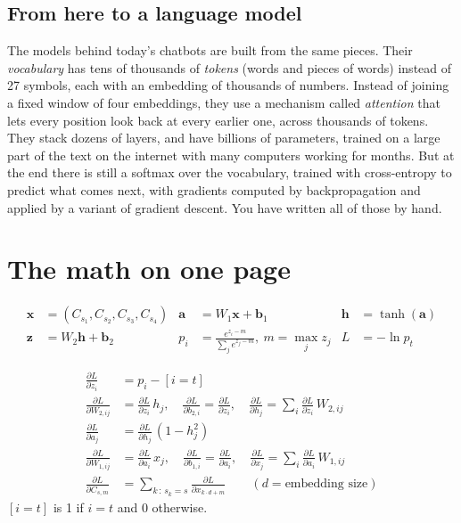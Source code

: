 \documentclass[11pt,a4paper,oneside,openany]{book}
\newcommand{\vect}[1]{\mathbf{#1}}
\newcommand{\pd}[2]{\frac{\partial #1}{\partial #2}}
\begin{document}
\section{From here to a language model}

The models behind today's chatbots are built from the same pieces. Their
\emph{vocabulary} has tens of thousands of \emph{tokens} (words and pieces
of words) instead of 27 symbols, each with an embedding of thousands of
numbers. Instead of joining a fixed window of four embeddings, they use a
mechanism called \emph{attention} that lets every position look back at
every earlier one, across thousands of tokens. They stack dozens of
layers, and have billions of parameters, trained on a large part of the
text on the internet with many computers working for months. But at the
end there is still a softmax over the vocabulary, trained with
cross-entropy to predict what comes next, with gradients computed by
backpropagation and applied by a variant of gradient descent. You have
written all of those by hand.

\appendix
\chapter{The math on one page}

\begin{mathbox}
\begin{align*}
  \vect{x} &= (C_{s_1}, C_{s_2}, C_{s_3}, C_{s_4}) &
  \vect{a} &= W_1\vect{x} + \vect{b}_1 &
  \vect{h} &= \tanh(\vect{a}) \\
  \vect{z} &= W_2\vect{h} + \vect{b}_2 &
  p_i &= \frac{e^{z_i - m}}{\sum_j e^{z_j - m}},\ m = \max_j z_j &
  L &= -\ln p_t
\end{align*}
\end{mathbox}

\begin{mathbox}
\begin{align*}
  \pd{L}{z_i} &= p_i - [i = t] \\
  \pd{L}{W_{2,ij}} &= \pd{L}{z_i}\,h_j, \quad
  \pd{L}{b_{2,i}} = \pd{L}{z_i}, \quad
  \pd{L}{h_j} = \sum_i \pd{L}{z_i}\,W_{2,ij} \\
  \pd{L}{a_j} &= \pd{L}{h_j}\,(1 - h_j^2) \\
  \pd{L}{W_{1,ij}} &= \pd{L}{a_i}\,x_j, \quad
  \pd{L}{b_{1,i}} = \pd{L}{a_i}, \quad
  \pd{L}{x_j} = \sum_i \pd{L}{a_i}\,W_{1,ij} \\
  \pd{L}{C_{s,m}} &= \sum_{k\,:\,s_k = s} \pd{L}{x_{k\cdot d + m}} \qquad (d = \text{embedding size})
\end{align*}
$[i = t]$ is 1 if $i = t$ and 0 otherwise.
\end{mathbox}
\end{document}
